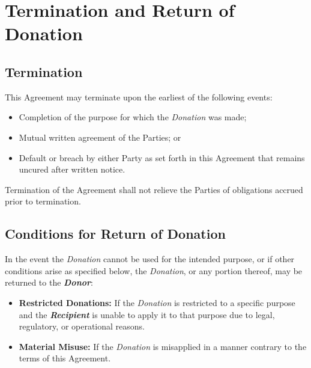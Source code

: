 
\section{Termination and Return of Donation}
\label{sec:termination}

\subsection{Termination}
This Agreement may terminate upon the earliest of the following events:
\begin{itemize}
  \item Completion of the purpose for which the \textit{Donation} was made;
  \item Mutual written agreement of the Parties; or
  \item Default or breach by either Party as set forth in this Agreement that remains uncured after written notice.
\end{itemize}

\vspace{0.3cm}

\noindent Termination of the Agreement shall not relieve the Parties of obligations accrued prior to termination.

\subsection{Conditions for Return of Donation}
In the event the \textit{Donation} cannot be used for the intended purpose, or if other conditions arise as specified below, the \textit{Donation}, or any portion thereof, may be returned to the \textbf{\textit{Donor}}:
\begin{itemize}
  \item \textbf{Restricted Donations: }If the \textit{Donation} is restricted to a specific purpose and the \textbf{\textit{Recipient}} is unable to apply it to that purpose due to legal, regulatory, or operational reasons.
  \item \textbf{Material Misuse: } If the \textit{Donation} is misapplied in a manner contrary to the terms of this Agreement.
\end{itemize}

